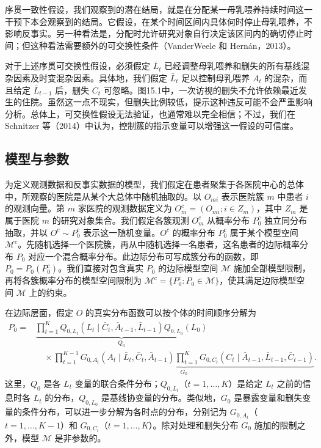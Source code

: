 序贯一致性假设，我们观察到的潜在结局，就是在分配某一母乳喂养持续时间这一干预下本会观察到的结局。它假设，在某个时间区间内具体何时停止母乳喂养，不影响反事实。另一种看法是，分配时允许研究对象自行决定该区间内的确切停止时间；但这种看法需要额外的可交换性条件（VanderWeele 和 Hernán，2013）。

对于上述序贯可交换性假设，必须假定 $\bar L_t$ 已经调整母乳喂养和删失的所有基线混杂因素及时变混杂因素。具体地，我们假定 $\bar L_t$ 足以控制母乳喂养 $A_t$ 的混杂，而且给定 $\bar L_{t-1}$ 后，删失 $C_t$ 可忽略。图15.1中，一次访视的删失不允许依赖最近发生的住院。虽然这一点不现实，但删失比例较低，提示这种违反可能不会严重影响分析。总体上，可交换性假设无法验证，也通常难以完全相信；不过，我们在 Schnitzer 等（2014）中认为，控制簇的指示变量可以增强这一假设的可信度。

\subsection{模型与参数}

为定义观测数据和反事实数据的模型，我们假定在患者聚集于各医院中心的总体中，所观察的医院是从某个大总体中随机抽取的。以 $O_{mi}$ 表示医院簇 $m$ 中患者 $i$ 的观测向量。第 $m$ 家医院的观测数据定义为 $O_m^c=(O_{mi};i\in Z_m)$，其中 $Z_m$ 是属于医院 $m$ 的研究对象集合。我们假定各簇观测 $O_m^c$ 从概率分布 $P_0^c$ 独立同分布抽取，并以 $O^c\sim P_0^c$ 表示这一随机变量。$O^c$ 的概率分布 $P_0^c$ 属于某个模型空间 $\mathcal M^c$。先随机选择一个医院簇，再从中随机选择一名患者，这名患者的边际概率分布 $P_0$ 对应一个混合概率分布。此边际分布可写成簇分布的函数，即 $P_0=P_0(P_0^c)$。我们直接对包含真实 $P_0$ 的边际模型空间 $\mathcal M$ 施加全部模型限制，再将各簇概率分布的模型空间限制为 $\mathcal M^c=\{P_0^c:P_0\in\mathcal M\}$，使其满足边际模型空间 $\mathcal M$ 上的约束。

在边际层面，假定 $O$ 的真实分布函数可以按个体的时间顺序分解为
\[
\begin{aligned}
 P_0={}&\underbrace{\prod_{t=1}^{K}
 Q_{0,L_t}(L_t\mid\bar C_t,\bar A_{t-1},\bar L_{t-1})Q_{0,L_0}(L_0)}_{Q_0}\\
 &\quad\times\underbrace{\prod_{t=1}^{K-1}
 G_{0,A_t}(A_t\mid\bar L_t,\bar C_t,\bar A_{t-1})
 \prod_{t=1}^{K}G_{0,C_t}(C_t\mid\bar A_{t-1},\bar L_{t-1},\bar C_{t-1})}_{G_0}.
\end{aligned}
\]
这里，$Q_0$ 是各 $L_t$ 变量的联合条件分布；$Q_{0,L_t}$（$t=1,\ldots,K$）是给定 $L_t$ 之前的信息时各 $L_t$ 的分布，$Q_{0,L_0}$ 是基线协变量的分布。类似地，$G_0$ 是暴露变量和删失变量的条件分布，可以进一步分解为各时点的分布，分别记为 $G_{0,A_t}$（$t=1,\ldots,K-1$）和 $G_{0,C_t}$（$t=1,\ldots,K$）。除对处理和删失分布 $G_0$ 施加的限制之外，模型 $\mathcal M$ 是非参数的。


